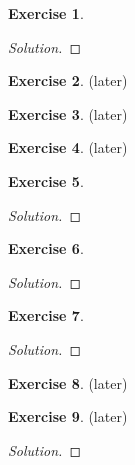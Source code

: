 \documentclass[12pt,a4]{article}
\theoremstyle{definition}
\newtheorem{exercise}{Exercise}
\begin{document}
\begin{exercise}
	
\end{exercise}
\begin{proof}[Solution]
	
\end{proof}

\begin{exercise}
	(later)
\end{exercise}

\begin{exercise}
	(later)
\end{exercise}

\begin{exercise}
	(later)
\end{exercise}

\begin{exercise}
	
\end{exercise}
\begin{proof}[Solution]
	
\end{proof}

\begin{exercise}
	
\end{exercise}
\begin{proof}[Solution]
	
\end{proof}

\begin{exercise}
	
\end{exercise}
\begin{proof}[Solution]
	
\end{proof}

\begin{exercise}
	(later) 
\end{exercise}

\begin{exercise}
	(later) 
\end{exercise}
\begin{proof}[Solution]
	
\end{proof}
\end{document}

